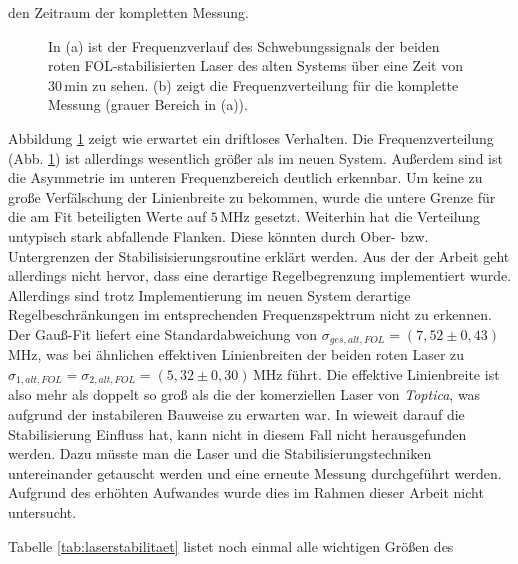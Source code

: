den Zeitraum der kompletten Messung.
\begin{figure}[hp]
 	\centering
 	\footnotesize
 	\fbox{\parbox{\dimexpr \linewidth - 2\fboxrule - 2\fboxsep}{
 	\subfloat[]{
		\label{subfig:beatfrequenzen_alt_FOL_drift}
		
		}\\
 	\subfloat[]{
		\label{subfig:beatfrequenzen_alt_FOL_histogramm}
		
		}
	}}
	\caption[Beatfrequenzen - altes System mit FOL]{In (a) ist der
	Frequenzverlauf des Schwebungssignals der beiden roten
	FOL-stabilisierten Laser des alten Systems über eine Zeit von
	$30\,$min zu sehen. (b) zeigt die Frequenzverteilung für die komplette Messung
	(grauer Bereich in (a)).}
	\label{fig:beatfrequenzen_alt_FOL}
\end{figure}
Abbildung
\ref{fig:beatfrequenzen_alt_FOL} zeigt wie erwartet ein driftloses Verhalten. Die
Frequenzverteilung (Abb.
\ref{fig:beatfrequenzen_alt_FOL}) ist allerdings wesentlich größer als im neuen System. Außerdem sind ist die
Asymmetrie im unteren Frequenzbereich deutlich erkennbar. Um keine zu große
Verfälschung der Linienbreite zu bekommen, wurde die untere Grenze für die am
Fit beteiligten Werte auf $5\,$MHz gesetzt. Weiterhin hat die Verteilung
untypisch stark abfallende Flanken. Diese könnten durch Ober- bzw.
Untergrenzen der Stabilisisierungsroutine erklärt werden. Aus der der Arbeit
\cite{kuschnick:2000:diplomarbeit} geht allerdings nicht hervor, dass eine
derartige Regelbegrenzung implementiert wurde. Allerdings sind trotz
Implementierung im neuen System derartige Regelbeschränkungen im entsprechenden
Frequenzspektrum nicht zu erkennen. Der Gauß-Fit liefert eine Standardabweichung
von $\sigma_{ges,alt,FOL}=(7,52\pm0,43)\,$MHz, was bei ähnlichen effektiven
Linienbreiten der beiden roten Laser zu
$\sigma_{1,alt,FOL}=\sigma_{2,alt,FOL}=(5,32\pm0,30)\,$MHz führt. Die effektive
Linienbreite ist also mehr als doppelt so groß als die der komerziellen Laser
von \textit{Toptica}, was aufgrund der instabileren Bauweise zu erwarten war.
In wieweit darauf die Stabilisierung Einfluss hat, kann nicht in diesem Fall
nicht herausgefunden werden. Dazu müsste man die Laser und die
Stabilisierungstechniken untereinander getauscht werden und eine erneute Messung
durchgeführt werden. Aufgrund des erhöhten Aufwandes wurde dies im Rahmen dieser
Arbeit nicht untersucht.\par
Tabelle \ref{tab:laserstabilitaet} listet noch einmal alle wichtigen Größen des
